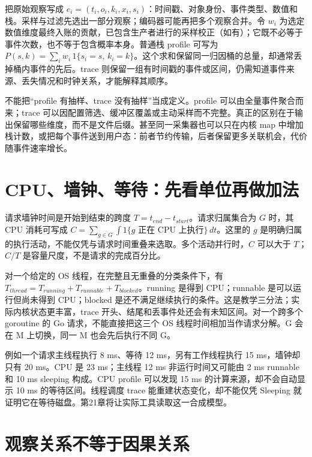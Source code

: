 \documentclass[UTF8,fontset=fandol,openany,11pt]{ctexbook}
\begin{document}
把原始观察写成 \(e_i=(t_i,o_i,k_i,x_i,s_i)\)：时间戳、对象身份、事件类型、数值和栈。采样与过滤先选出一部分观察；编码器可能再把多个观察合并。令 \(w_i\) 为选定数值维度最终入账的贡献，已包含生产者进行的采样校正（如有）；它既不必等于事件次数，也不等于包含概率本身。普通栈 profile 可写为 \(P(s,k)=\sum_i w_i\,1\{s_i=s,\,k_i=k\}\)。这个求和保留同一归因桶的总量，却通常丢掉桶内事件的先后。trace 则保留一组有时间戳的事件或区间，仍需知道事件来源、丢失情况和时钟关系，才能解释其顺序。\cite{pp-proto}\cite{pp-cpu-builder}


不能把“profile 有抽样、trace 没有抽样”当成定义。profile 可以由全量事件聚合而来；trace 可以因配置筛选、缓冲区覆盖或主动采样而不完整。真正的区别在于输出保留哪些维度，而不是文件后缀。甚至同一采集器也可以只在内核 map 中增加栈计数，或把每个事件送到用户态：前者节约传输，后者保留更多关联机会，代价随事件速率增长。


\section{CPU、墙钟、等待：先看单位再做加法}

请求墙钟时间是开始到结束的跨度 \(T=t_{end}-t_{start}\)。请求归属集合为 \(G\) 时，其 CPU 消耗可写成 \(C=\sum_{g\in G}\int 1\{g\text{ 正在 CPU 上执行}\}\,dt\)。这里的 \(g\) 是明确归属的执行活动，不能仅凭与请求时间重叠来选取。多个活动并行时，\(C\) 可以大于 \(T\)；\(C/T\) 是容量尺度，不是请求的完成百分比。


对一个给定的 OS 线程，在完整且无重叠的分类条件下，有 \(T_{thread}=T_{running}+T_{runnable}+T_{blocked}\)。running 是得到 CPU；runnable 是可以运行但尚未得到 CPU；blocked 是还不满足继续执行的条件。这是教学三分法；实际内核状态更丰富，trace 开头、结尾和丢事件处还会有未知区间。对一个跨多个 goroutine 的 Go 请求，不能直接把这三个 OS 线程时间相加当作请求分解。G 会在 M 上切换，同一 M 也会先后执行不同 G。\cite{pp-cpu-linux}\cite{pp-sema}


例如一个请求主线程执行 8 ms、等待 12 ms，另有工作线程执行 15 ms，墙钟却只有 20 ms。CPU 是 23 ms；主线程 12 ms 非运行时间又可能由 2 ms runnable 和 10 ms sleeping 构成。CPU profile 可以发现 15 ms 的计算来源，却不会自动显示 10 ms 的等待区间。线程调度 trace 能重建状态变化，却不能仅凭 Sleeping 就证明它在等待磁盘。第21章将让实际工具读取这一合成模型。


\section{观察关系不等于因果关系}
\end{document}
